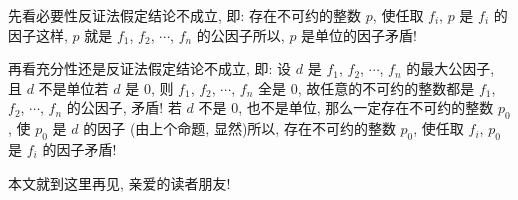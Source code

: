 \begin{pf}
    先看必要性\period 反证法\period 假定结论不成立, 即: 存在不可约的整数 $p$, 使任取 $f_i$, $p$ 是 $f_i$ 的因子\period 这样, $p$ 就是 $f_1$, $f_2$, $\cdots$, $f_n$ 的公因子\period 所以, $p$ 是单位的因子\period 矛盾!

    再看充分性\period 还是反证法\period 假定结论不成立, 即: 设 $d$ 是 $f_1$, $f_2$, $\cdots$, $f_n$ 的最大公因子, 且 $d$ 不是单位\period 若 $d$ 是 $0$, 则 $f_1$, $f_2$, $\cdots$, $f_n$ 全是 $0$, 故任意的不可约的整数都是 $f_1$, $f_2$, $\cdots$, $f_n$ 的公因子, 矛盾! 若 $d$ 不是 $0$, 也不是单位, 那么一定存在不可约的整数 $p_0$, 使 $p_0$ 是 $d$ 的因子 (由上个命题, 显然)\period 所以, 存在不可约的整数 $p_0$, 使任取 $f_i$, $p_0$ 是 $f_i$ 的因子\period 矛盾!
\end{pf}

本文就到这里\period 再见, 亲爱的读者朋友!
